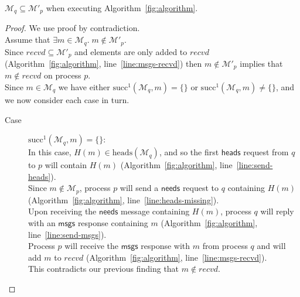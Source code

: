 \documentclass[a4paper,anonymous,USenglish]{lipics-v2019}
\begin{document}
\begin{lemma}\label{lemma:no-q-missing}
$\mathcal{M}_q \subseteq \mathcal{M}'_p$ when executing Algorithm~\ref{fig:algorithm}.
\end{lemma}
\begin{proof}
We use proof by contradiction.\\
Assume that $\exists m \in \mathcal{M}_q.\; m \notin  \mathcal{M}'_p$.\\
Since $\mathit{recvd} \subseteq \mathcal{M}'_p$ and elements are only added to $\mathit{recvd}$ (Algorithm~\ref{fig:algorithm}, line~\ref{line:msgs-recvd}) then $m \notin  \mathcal{M}'_p$ implies that $m \notin \mathit{recvd}$ on process $p$.\\
Since $m \in \mathcal{M}_q$ we have either $\mathrm{succ}^1(\mathcal{M}_q, m) = \{\}$ or $\mathrm{succ}^1(\mathcal{M}_q, m) \ne \{\}$, and we now consider each case in turn.
\begin{description}
    \item[Case] $\mathrm{succ}^1(\mathcal{M}_q, m) = \{\}$:\\
    In this case, $H(m) \in \mathrm{heads}(\mathcal{M}_q)$, and so the first $\mathsf{heads}$ request from $q$ to $p$ will contain $H(m)$ (Algorithm~\ref{fig:algorithm}, line~\ref{line:send-heads}).\\
    Since $m \notin \mathcal{M}_p$, process $p$ will send a $\mathsf{needs}$ request to $q$ containing $H(m)$ (Algorithm~\ref{fig:algorithm}, line~\ref{line:heads-missing}).\\
    Upon receiving the $\mathsf{needs}$ message containing $H(m)$, process $q$ will reply with an $\mathsf{msgs}$ response containing $m$ (Algorithm~\ref{fig:algorithm}, line~\ref{line:send-msgs}).\\
    Process $p$ will receive the $\mathsf{msgs}$ response with $m$ from process $q$ and will add $m$ to $\mathit{recvd}$ (Algorithm~\ref{fig:algorithm}, line~\ref{line:msgs-recvd}).\\
    This contradicts our previous finding that $m \notin \mathit{recvd}$.
    

\end{description}
\end{proof}
\end{document}
